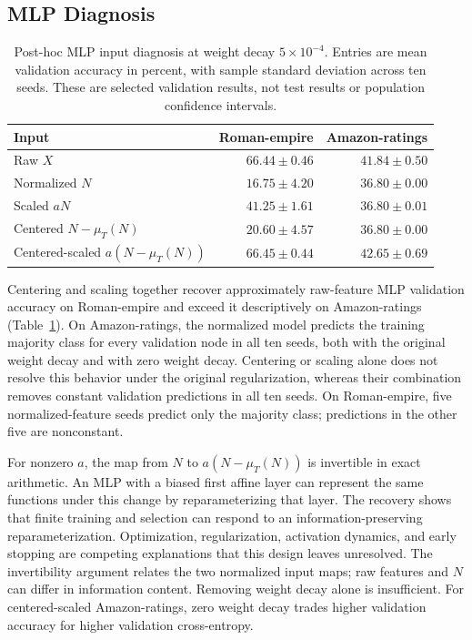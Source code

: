 \subsection{MLP Diagnosis}

\begin{table}[ht]
\centering
\caption{Post-hoc MLP input diagnosis at weight decay $5\times10^{-4}$. Entries are mean validation accuracy in percent, with sample standard deviation across ten seeds. These are selected validation results, not test results or population confidence intervals.}
\label{tab:mlp_parameterization}
\small
\begin{tabular}{@{}lrr@{}}
\toprule
Input & Roman-empire & Amazon-ratings \\
\midrule
Raw $X$ & $66.44\pm0.46$ & $41.84\pm0.50$ \\
Normalized $N$ & $16.75\pm4.20$ & $36.80\pm0.00$ \\
Scaled $aN$ & $41.25\pm1.61$ & $36.80\pm0.01$ \\
Centered $N-\mu_T(N)$ & $20.60\pm4.57$ & $36.80\pm0.00$ \\
Centered-scaled $a(N-\mu_T(N))$ & $66.45\pm0.44$ & $42.65\pm0.69$ \\
\bottomrule
\end{tabular}
\end{table}

Centering and scaling together recover approximately raw-feature MLP validation accuracy on Roman-empire and exceed it descriptively on Amazon-ratings (Table~\ref{tab:mlp_parameterization}). On Amazon-ratings, the normalized model predicts the training majority class for every validation node in all ten seeds, both with the original weight decay and with zero weight decay. Centering or scaling alone does not resolve this behavior under the original regularization, whereas their combination removes constant validation predictions in all ten seeds. On Roman-empire, five normalized-feature seeds predict only the majority class; predictions in the other five are nonconstant.

For nonzero $a$, the map from $N$ to $a(N-\mu_T(N))$ is invertible in exact arithmetic. An MLP with a biased first affine layer can represent the same functions under this change by reparameterizing that layer. The recovery shows that finite training and selection can respond to an information-preserving reparameterization. Optimization, regularization, activation dynamics, and early stopping are competing explanations that this design leaves unresolved. The invertibility argument relates the two normalized input maps; raw features and $N$ can differ in information content. Removing weight decay alone is insufficient. For centered-scaled Amazon-ratings, zero weight decay trades higher validation accuracy for higher validation cross-entropy.

